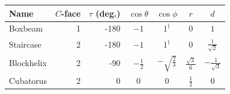 \begin{center}
\small
\renewcommand{\arraystretch}{1.7}
\begin{tabular}{@{}lrrcccc@{}}
\toprule
Name & $C$-face & $\tau$ (deg.) & $\cos\theta$ & $\cos\phi$ & $r$ & $d$\\
\midrule
Boxbeam & 1 & -180 & $\displaystyle -1$ & $\displaystyle 1^{\dagger}$ & $\displaystyle 0$ & $\displaystyle 1$\\
Staircase & 2 & -180 & $\displaystyle -1$ & $\displaystyle 1^{\dagger}$ & $\displaystyle 0$ & $\displaystyle \frac{1}{\sqrt{2}}$\\
Blockhelix & 2 & -90 & $\displaystyle - \frac{1}{2}$ & $\displaystyle - \sqrt{\frac{2}{3}}$ & $\displaystyle \frac{\sqrt{2}}{6}$ & $\displaystyle - \frac{1}{\sqrt{3}}$\\
Cubatorus & 2 & 0 & $\displaystyle 0$ & $\displaystyle 0$ & $\displaystyle \frac{1}{2}$ & $\displaystyle 0$\\
\bottomrule
\end{tabular}
\end{center}
